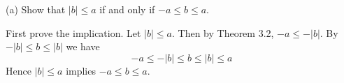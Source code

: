 
(a) Show that $|b|\le a$ if and only if $-a\le b\le a$.

\medskip
First prove the implication.
Let $|b|\le a$.
Then by Theorem 3.2, $-a\le-|b|$.
By $-|b|\le b\le|b|$ we have
$$-a\le-|b|\le b\le|b|\le a$$
Hence $|b|\le a$ implies $-a\le b\le a$.

